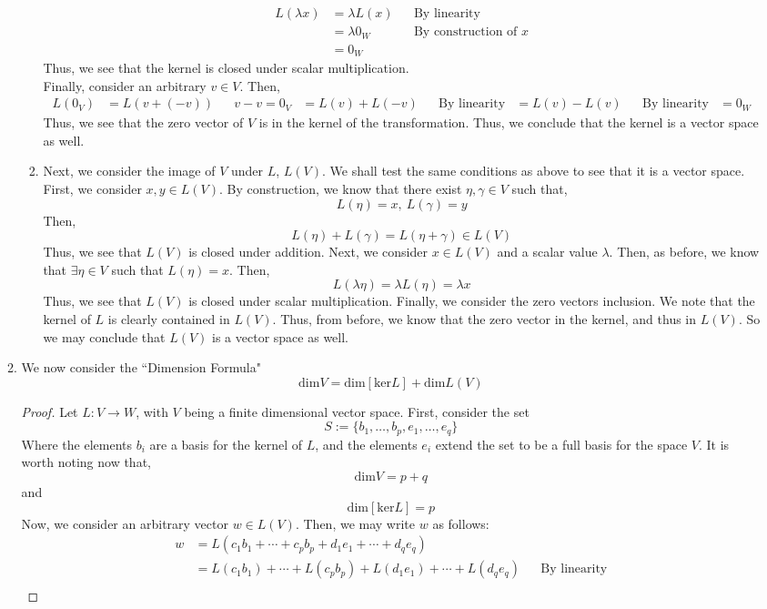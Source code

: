 \documentclass[letterpaper,10pt]{article}
\begin{document}
\begin{enumerate}
\begin{enumerate}
\begin{enumerate}
\begin{align*}
L(\lambda x) &= \lambda L(x) && \text{By linearity}\\
&= \lambda 0_W && \text{By construction of $x$}\\
&= 0_W
\end{align*}
Thus, we see that the kernel is closed under scalar multiplication.\\
Finally, consider an arbitrary $v\in V$. Then,
\begin{align*}
L(0_V) &= L(v+(-v)) && v-v=0_V
&=L(v)+L(-v) && \text{By linearity}
&=L(v)-L(v) && \text{By linearity}
&=0_W
\end{align*}
Thus, we see that the zero vector of $V$ is in the kernel of the transformation. Thus, we conclude that the kernel is a vector space as well.
\item Next, we consider the image of $V$ under $L$, $L(V)$. We shall test the same conditions as above to see that it is a vector space. First, we consider $x,y\in L(V)$. By construction, we know that there exist $\eta,\gamma\in V$ such that,
\[L(\eta)=x,\ L(\gamma)=y\]
Then,
\[L(\eta)+L(\gamma) = L(\eta+\gamma)\in L(V)\]
Thus, we see that $L(V)$ is closed under addition. Next, we consider $x\in L(V)$ and a scalar value $\lambda$. Then, as before, we know that $\exists \eta \in V$ such that $L(\eta)=x$. Then,
\[L(\lambda \eta)=\lambda L(\eta)=\lambda x\]
Thus, we see that $L(V)$ is closed under scalar multiplication. Finally, we consider the zero vectors inclusion. We note that the kernel of $L$ is clearly contained in $L(V)$. Thus, from before, we know that the zero vector in the kernel, and thus in $L(V)$. So we may conclude that $L(V)$ is a vector space as well.
\end{enumerate}
\item We now consider the ``Dimension Formula"
\[\text{dim}V=\text{dim}[\text{ker}L]+\text{dim}L(V)\]
\begin{proof}
Let $L: V\to W$, with $V$ being a finite dimensional vector space. First, consider the set \[S:=\{b_1,\ldots,b_p,e_1,\ldots,e_q\}\]
Where the elements $b_i$ are a basis for the kernel of $L$, and the elements $e_i$ extend the set to be a full basis for the space $V$. It is worth noting now that,
\[\text{dim}V=p+q\]
and
\[\text{dim}[\text{ker}L]=p\]
Now, we consider an arbitrary vector $w\in L(V)$. Then, we may write $w$ as follows:
\begin{align*}
w &= L(c_1b_1+\cdots+c_pb_p+d_1e_1+\cdots+d_qe_q)\\
&= L(c_1b_1)+\cdots+L(c_pb_p)+L(d_1e_1)+\cdots+L(d_qe_q) && \text{By linearity}\\

\end{align*}
\end{proof}
\end{enumerate}
\end{enumerate}
\end{document}
